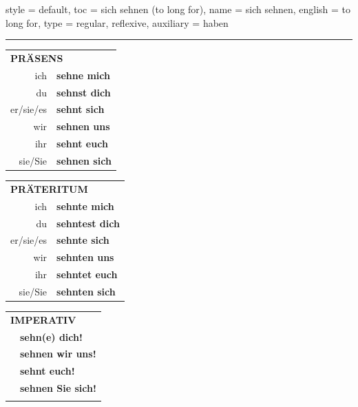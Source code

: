 \begin{verbentry}{
  style = {default},
  toc = {sich sehnen (to long for)},
  name = {sich sehnen},
  english = {to long for},
  type = {regular, reflexive},
  auxiliary = {haben}
}
 
    
     \vspace{5pt}

    \hrule
    
    \vspace{5pt}

  \begin{tabular}{rl}
     \multicolumn{2}{l}{\textbf{PRÄSENS} }\\
    ich & \textbf{sehne mich}\\
    du & \textbf{sehnst dich}\\
    er/sie/es & \textbf{sehnt sich}\\
    wir & \textbf{sehnen uns}\\
    ihr & \textbf{sehnt euch}\\
    sie/Sie & \textbf{sehnen sich}\\
  \end{tabular}
  \hfill
     \begin{tabular}{rl}
    \multicolumn{2}{l}{\textbf{PRÄTERITUM} }\\
    ich & \textbf{sehnte mich}\\
    du & \textbf{sehntest dich}\\
    er/sie/es & \textbf{sehnte sich}\\
    wir & \textbf{sehnten uns}\\
    ihr & \textbf{sehntet euch}\\
    sie/Sie & \textbf{sehnten sich}\\
  \end{tabular}
  \hfill
  \begin{tabular}{rl}
     \multicolumn{2}{l}{\textbf{IMPERATIV} }\\
   & \textbf{sehn(e) dich!}\\
   & \textbf{sehnen wir uns!}\\
   & \textbf{sehnt euch!}\\
   & \textbf{sehnen Sie sich!}\\
   & \vspace{10pt}
  \end{tabular}

    \vspace{10pt}


\end{verbentry}
